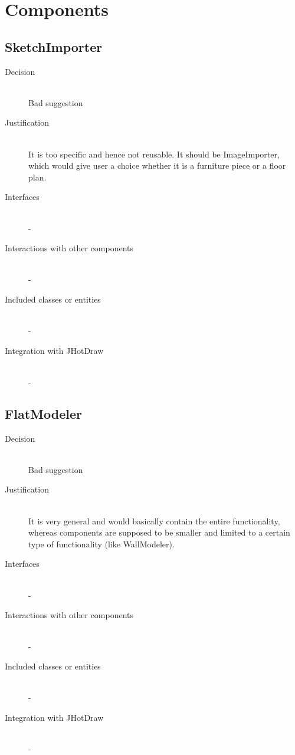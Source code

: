 \section{Components}

\subsection{SketchImporter}
	\begin{description}
		\item[Decision] \hfill \\ Bad suggestion
		\item[Justification] \hfill \\ It is too specific and hence not reusable. It should be ImageImporter, which would give user a choice whether it is a furniture piece or a floor plan.
		\item[Interfaces] \hfill \\ -
		\item[Interactions with other components] \hfill \\ -
		\item[Included classes or entities] \hfill \\ -
		\item[Integration with JHotDraw] \hfill \\ -
	\end{description}

\subsection{FlatModeler}
	\begin{description}
		\item[Decision] \hfill \\ Bad suggestion
		\item[Justification] \hfill \\ It is very general and would basically contain the entire functionality, whereas components are supposed to be smaller and limited to a certain type of functionality (like WallModeler).
		\item[Interfaces] \hfill \\ -
		\item[Interactions with other components] \hfill \\ -
		\item[Included classes or entities] \hfill \\ -
		\item[Integration with JHotDraw] \hfill \\ -
	\end{description}

